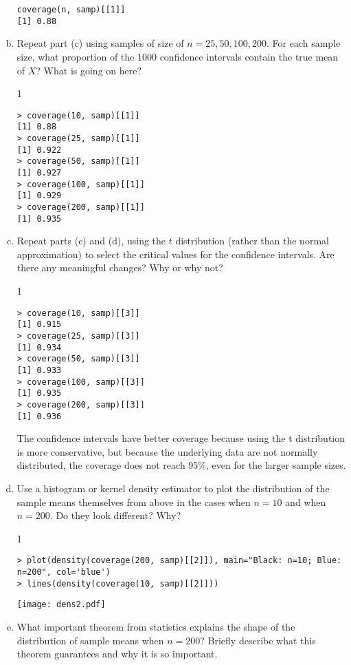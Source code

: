 \documentclass[12pt,letterpaper]{article}
\newcommand{\solutions}{0}
\begin{document}
\begin{enumerate}[(a)]
{\begin{verbatim}
coverage(n, samp)[[1]]
[1] 0.88
\end{verbatim}
}
\fi

\item Repeat part (c) using samples of size of $n = 25, 50, 100, 200$. For each sample size, what proportion of the 1000 confidence intervals contain the true mean of $X$? What is going on here? 

\if\solutions1
{\color{red}
\begin{verbatim}
> coverage(10, samp)[[1]]
[1] 0.88
> coverage(25, samp)[[1]]
[1] 0.922
> coverage(50, samp)[[1]]
[1] 0.927
> coverage(100, samp)[[1]]
[1] 0.929
> coverage(200, samp)[[1]]
[1] 0.935
\end{verbatim}
}
\fi

\item Repeat parts (c) and (d), using the $t$ distribution (rather than the normal approximation) to select the critical values for the confidence intervals. Are there any meaningful changes? Why or why not?

\if\solutions1
{\color{red}
\begin{verbatim}
> coverage(10, samp)[[3]]
[1] 0.915
> coverage(25, samp)[[3]]
[1] 0.934
> coverage(50, samp)[[3]]
[1] 0.933
> coverage(100, samp)[[3]]
[1] 0.935
> coverage(200, samp)[[3]]
[1] 0.936
\end{verbatim}
The confidence intervals have better coverage because using the t distribution is more conservative, but because the underlying data are not normally distributed, the coverage does not reach 95\%, even for the larger sample sizes.
}
\fi

\item Use a histogram or kernel density estimator to plot the distribution of the sample means themselves from above in the cases when $n = 10$ and when $n = 200$. Do they look different? Why?

\if\solutions1
{\color{red}
\begin{verbatim}
> plot(density(coverage(200, samp)[[2]]), main="Black: n=10; Blue: n=200", col='blue')
> lines(density(coverage(10, samp)[[2]]))
\end{verbatim}
}
\begin{center}
\vspace*{0cm}\hspace*{0cm}\texttt{[image: dens2.pdf]}
\end{center}
\fi

\item What important theorem from statistics explains the shape of the distribution of sample means when $n = 200$? Briefly describe what this theorem guarantees and why it is so important.


\end{enumerate}
\end{document}
